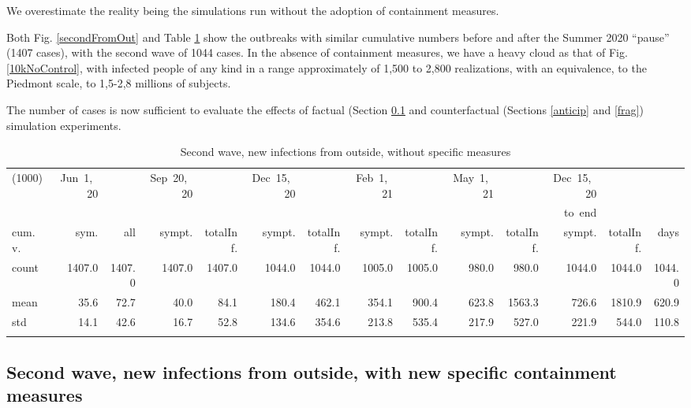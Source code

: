 \documentclass[graybox]{svmult}
\begin{document}
We overestimate the reality being the simulations run without the adoption of containment measures.

Both Fig. \ref{secondFromOut} and Table \ref{selForceWave2Tab} show the outbreaks with similar cumulative numbers before and after the Summer 2020 ``pause'' (1407 cases), with the second wave of 1044 cases. In the absence of containment measures, we have a heavy cloud as that of Fig. \ref{10kNoControl}, with infected people of any kind in a range approximately of 1,500 to 2,800 realizations, with an equivalence, to the Piedmont scale, to 1,5-2,8 millions of subjects.

The number of cases is now sufficient to evaluate the effects of factual (Section \ref{secondWith} and counterfactual (Sections \ref{anticip} and \ref{frag}) simulation experiments.


\begin{table}[t]
\center
\tiny
\begin{tabular}{lrrrrrrrrrrrrr}
\hline\noalign{\smallskip}
(1000) & Jun~1,~20 & & Sep~20,~20 & & Dec~15,~20 & & Feb~1,~21 & & May~1,~21 & & Dec~15,~20 \\
& & & & & & & & & & & to~end \\
cum.~v. & sym. & all & sympt. & totalInf. & sympt. & totalInf. & sympt. & totalInf. & sympt. & totalInf. & sympt. & totalInf. & days\\
\noalign{\smallskip}\svhline\noalign{\smallskip}
count & 1407.0 & 1407.0 & 1407.0 & 1407.0 & 1044.0 & 1044.0 & 1005.0 & 1005.0 & 980.0 & 980.0 & 1044.0 & 1044.0 & 1044.0 \\
mean & 35.6 & 72.7 & 40.0 & 84.1 & 180.4 & 462.1 & 354.1 & 900.4 & 623.8 & 1563.3 & 726.6 & 1810.9 & 620.9 \\
std & 14.1 & 42.6 & 16.7 & 52.8 & 134.6 & 354.6 & 213.8 & 535.4 & 217.9 & 527.0 & 221.9 & 544.0 & 110.8 \\
\hline\noalign{\smallskip}
\end{tabular}
\caption{Second wave, new infections from outside, without specific measures}
\label{selForceWave2Tab}
\end{table}



\subsection{Second wave, new infections from outside, with new specific containment measures}
\label{secondWith}
\end{document}
